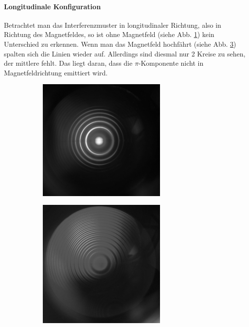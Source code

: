 \paragraph{Longitudinale Konfiguration}
Betrachtet man das Interferenzmuster in longitudinaler Richtung, also in Richtung des Magnetfeldes, so ist ohne Magnetfeld (siehe Abb. \ref{fig:bildlongohneB}) kein Unterschied zu erkennen. Wenn man das Magnetfeld hochfährt (siehe Abb. \ref{fig:bildlongmitB}) spalten sich die Linien wieder auf. Allerdings sind diesmal nur 2 Kreise zu sehen, der mittlere fehlt. Das liegt daran, dass die $\pi$-Komponente nicht in Magnetfeldrichtung emittiert wird.

\begin{figure}[h]
  \centering
  \begin{subfigure}[h]{0.5\textwidth}
    \centering
    \includegraphics[width=0.7\textwidth]{data/bilder_okular/bild_5_edit.jpg}
    \label{fig:bildlongohneB}
  \end{subfigure}%
  \begin{subfigure}[h]{0.5\textwidth}
    \centering
    \includegraphics[width=0.7\textwidth]{data/bilder_okular/bild_6_edit.jpg}
    \label{fig:bildlongmitB}
  \end{subfigure}
  \caption{}
\end{figure}

